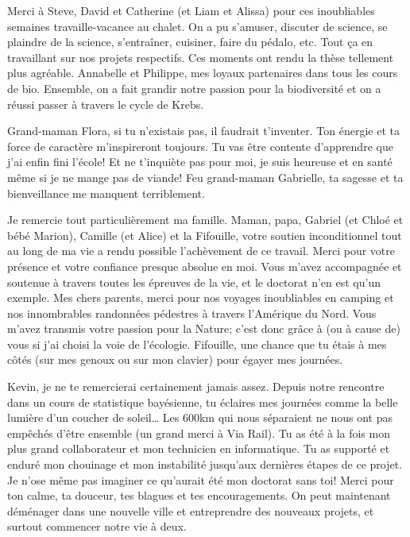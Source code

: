 Merci à Steve, David et Catherine (et Liam et Alissa) pour ces
inoubliables semaines travaille-vacance au chalet. On a pu s'amuser,
discuter de science, se plaindre de la science, s'entraîner, cuisiner,
faire du pédalo, etc. Tout ça en travaillant sur nos projets respectifs.
Ces moments ont rendu la thèse tellement plus agréable. Annabelle et
Philippe, mes loyaux partenaires dans tous les cours de bio. Ensemble,
on a fait grandir notre passion pour la biodiversité et on a réussi
passer à travers le cycle de Krebs.

Grand-maman Flora, si tu n'existais pas, il faudrait t'inventer. Ton
énergie et ta force de caractère m'inspireront toujours. Tu vas être
contente d'apprendre que j'ai enfin fini l'école! Et ne t'inquiète pas
pour moi, je suis heureuse et en santé même si je ne mange pas de
viande! Feu grand-maman Gabrielle, ta sagesse et ta bienveillance me
manquent terriblement.

Je remercie tout particulièrement ma famille. Maman, papa, Gabriel (et
Chloé et bébé Marion), Camille (et Alice) et la Fifouille, votre soutien
inconditionnel tout au long de ma vie a rendu possible l'achèvement de
ce travail. Merci pour votre présence et votre confiance presque absolue
en moi. Vous m'avez accompagnée et soutenue à travers toutes les
épreuves de la vie, et le doctorat n'en est qu'un exemple. Mes chers
parents, merci pour nos voyages inoubliables en camping et nos
innombrables randonnées pédestres à travers l'Amérique du Nord. Vous
m'avez transmis votre passion pour la Nature; c'est donc grâce à (ou à
cause de) vous si j'ai choisi la voie de l'écologie. Fifouille, une
chance que tu étais à mes côtés (sur mes genoux ou sur mon clavier) pour
égayer mes journées.

Kevin, je ne te remercierai certainement jamais assez. Depuis notre
rencontre dans un cours de statistique bayésienne, tu éclaires mes
journées comme la belle lumière d'un coucher de soleil\ldots{} Les 600km
qui nous séparaient ne nous ont pas empêchés d'être ensemble (un grand
merci à Via Rail). Tu as été à la fois mon plus grand collaborateur et
mon technicien en informatique. Tu as supporté et enduré mon chouinage
et mon instabilité jusqu'aux dernières étapes de ce projet. Je n'ose
même pas imaginer ce qu'aurait été mon doctorat sans toi! Merci pour ton
calme, ta douceur, tes blagues et tes encouragements. On peut maintenant
déménager dans une nouvelle ville et entreprendre des nouveaux projets,
et surtout commencer notre vie à deux.
